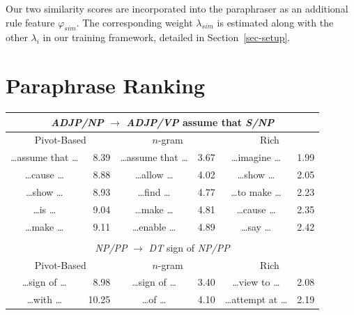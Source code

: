 \documentclass[11pt]{article}
\begin{document}
Our two similarity scores are incorporated into the paraphraser as an
additional rule feature $\varphi_{\mathit{sim}}$. The corresponding
weight $\lambda_{\mathit{sim}}$ is estimated along with the other
$\lambda_i$ in our training framework, detailed in
Section~\ref{sec-setup}.


\section{Paraphrase Ranking}
\label{sec-ranking}

\begin{table}[!t]
\begin{center}
\begin{tabular}{|cr|cr|cr|}
  \hline
  \multicolumn{6}{|c|}{\emph{ADJP/NP} $\rightarrow$ \emph{ADJP/VP}
    assume that \emph{S/NP}} \\
  \hline
  \multicolumn{2}{|c|}{Pivot-Based} &
  \multicolumn{2}{c|}{$n$-gram} &
  \multicolumn{2}{c|}{Rich} \\
  \hline
  \ldots assume that \ldots & 8.39 &
  \ldots assume that \ldots & 3.67 &
  \ldots imagine \ldots & 1.99 \\

  \ldots cause \ldots & 8.88 &
  \ldots allow \ldots & 4.02 &
  \ldots show \ldots & 2.05 \\

  \ldots show \ldots & 8.93 &
  \ldots find \ldots & 4.77 &
  \ldots to make \ldots & 2.23 \\

  \ldots is \ldots & 9.04 &
  \ldots make \ldots & 4.81 &
  \ldots cause \ldots & 2.35 \\

  \ldots make \ldots & 9.11 &
  \ldots enable \ldots & 4.89 &
  \ldots say \ldots & 2.42 \\

  \hline
  \multicolumn{6}{c}{} \\
  \hline
  \multicolumn{6}{|c|}{\emph{NP/PP} $\rightarrow$ \emph{DT}
    sign of \emph{NP/PP}} \\
  \hline
  \multicolumn{2}{|c|}{Pivot-Based} &
  \multicolumn{2}{c|}{$n$-gram} &
  \multicolumn{2}{c|}{Rich} \\
  \hline

  \ldots sign of \ldots & 8.98 &
  \ldots sign of \ldots & 3.40 &
  \ldots view to \ldots & 2.08 \\

  \ldots with \ldots & 10.25 &
  \ldots of \ldots & 4.10 &
  \ldots attempt at \ldots & 2.19 \\


\end{tabular}
\end{center}
\end{table}
\end{document}
